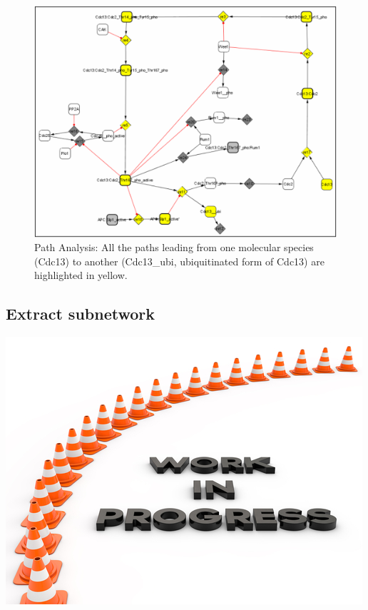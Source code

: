 \begin{figure}
\centering
\includegraphics[width=14 cm]{graphics/Path_Analysis_All_the_paths}
\caption{Path Analysis: All the paths leading from one molecular species (Cdc13) to another (Cdc13\_ubi, ubiquitinated form of Cdc13) are highlighted in yellow.}
\label{Path_Analysis_All_the_paths}
\end{figure}
\subsection{Extract subnetwork}
\includegraphics{graphics/work_in_progress}

